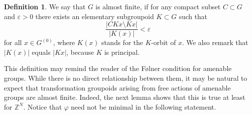 \documentclass[11pt]{article}
\theoremstyle{definition}
\newtheorem{df}[thm]{Definition}
\renewcommand{\phi}{\varphi}
\newcommand{\ep}{\varepsilon}
\newcommand{\Z}{\mathbb{Z}}
\begin{document}
\begin{df}\label{almstfnt}
We say that $G$ is almost finite, 
if for any compact subset $C\subset G$ and $\ep>0$ 
there exists an elementary subgroupoid $K\subset G$ such that 
\[
\frac{\lvert CKx\setminus Kx\rvert}{\lvert K(x)\rvert}<\ep
\]
for all $x\in G^{(0)}$, 
where $K(x)$ stands for the $K$-orbit of $x$. 
We also remark that $\lvert K(x)\rvert$ equals $\lvert Kx\rvert$, 
because $K$ is principal. 
\end{df}

This definition may remind the reader 
of the F\o lner condition for amenable groups. 
While there is no direct relationship between them, 
it may be natural to expect that 
transformation groupoids arising from free actions of amenable groups 
are almost finite. 
Indeed, the next lemma shows that this is true at least for $\Z^N$. 
Notice that $\phi$ need not be minimal in the following statement. 
\end{document}
